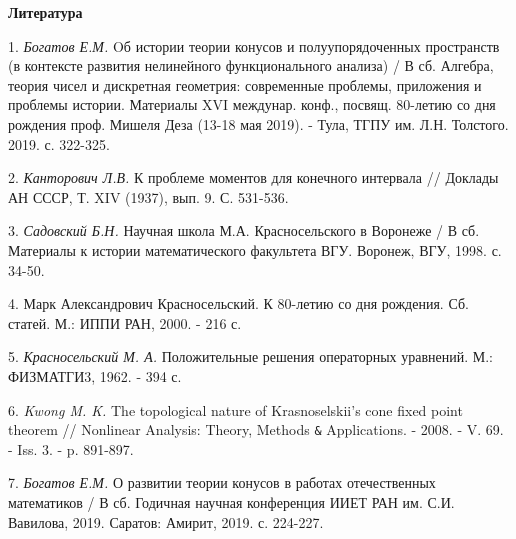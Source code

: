 \smallskip \centerline {\bf Литература} \nopagebreak

1. \textit{Богатов Е.М.} Oб истории теории конусов и полуупорядоченных пространств (в контексте развития нелинейного функционального анализа) / В сб. Алгебра, теория чисел и дискретная геометрия: современные проблемы, приложения и проблемы истории. Материалы XVI междунар. конф., посвящ. 80-летию со дня рождения проф. Мишеля Деза (13-18 мая 2019). - Тула, ТГПУ им. Л.Н. Толстого. 2019. с. 322-325.

2. \textit{Канторович Л.В.} К проблеме моментов для конечного интервала // Доклады АН СССР, Т. XIV (1937), вып. 9. С. 531-536.

3. \textit{Садовский Б.Н.} Научная школа М.А. Красносельского в Воронеже / В сб. Материалы к истории математического факультета ВГУ. Воронеж, ВГУ, 1998. с. 34-50.

4. Марк Александрович Красносельский. К 80-летию со дня рождения. Сб. статей. М.: ИППИ РАН, 2000. - 216 с.

5. \textit{Красносельский М. А.} Положительные решения операторных уравнений. М.: ФИЗМАТГИ3, 1962. - 394 с.

6. \textit{Kwong M. K.} The topological nature of Krasnoselskii's cone fixed point theorem // Nonlinear Analysis: Theory, Methods \verb'&' Applications. - 2008. - V. 69. - Iss. 3. - p. 891-897.

7. \textit{Богатов Е.М.} О развитии теории конусов в работах отечественных математиков / В сб. Годичная научная конференция ИИЕТ РАН им. С.И. Вавилова, 2019. Саратов: Амирит, 2019. с. 224-227.
